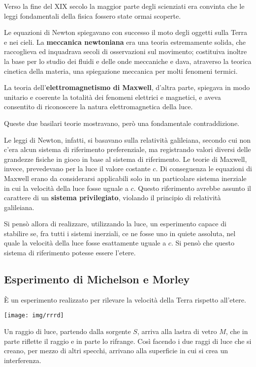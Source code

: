 \documentclass[a4paper, oneside]{article}
\newcounter{newton}
\newcounter{i}%
\newcounter{n}%
\newcounter{I}%
\begin{document}
Verso la fine del XIX secolo la maggior parte degli scienziati era convinta che le leggi fondamentali della fisica fossero state ormai scoperte.

Le equazioni di Newton spiegavano con successo il moto degli oggetti sulla Terra e nei cieli. La \textbf{meccanica newtoniana} era una teoria estremamente solida, che raccoglieva ed inquadrava secoli di osservazioni sul movimento; costituiva inoltre la base per lo studio dei fluidi e delle onde meccaniche e dava, atraverso la teorica cinetica della materia, una spiegazione meccanica per molti fenomeni termici.

La teoria dell'\textbf{elettromagnetismo di Maxwell}, d'altra parte, spiegava in modo unitario e coerente la totalità dei fenomeni elettrici e magnetici, e aveva consentito di riconoscere la natura elettromagnetica della luce.

Queste due basilari teorie mostravano, però una fondamentale contraddizione.

Le leggi di Newton, infatti, si basavano sulla relatività galileiana, secondo cui non c'era alcun sistema di riferimento preferenziale, ma registrando valori diversi delle grandezze fisiche in gioco in base al sistema di riferimento.
Le teorie di Maxwell, invece, prevedevano per la luce il valore costante $c$. Di conseguenza le equazioni di Maxwell erano da considerarsi applicabili solo in un particolare sistema inerziale in cui la velocità della luce fosse uguale a $c$. Questo riferimento avrebbe assunto il carattere di un \textbf{sistema privilegiato}, violando il principio di relatività galileiana.

Si pensò allora di realizzare, utilizzando la luce, un esperimento capace di stabilire se, fra tutti i sistemi inerziali, ce ne fosse uno in quiete assoluta, nel quale la velocità della luce fosse esattamente uguale a $c$. Si pensò che questo sistema di riferimento potesse essere l'etere.

\subsection{Esperimento di Michelson e Morley}

È un esperimento realizzato per rilevare la velocità della Terra rispetto all'etere.

\begin{center}
\texttt{[image: img/rrrd]}
\end{center}

Un raggio di luce, partendo dalla sorgente $S$, arriva alla lastra di vetro $M$, che in parte riflette il raggio e in parte lo rifrange.
Così facendo i due raggi di luce che si creano, per mezzo di altri specchi, arrivano alla superficie in cui si crea un interferenza.
\end{document}
